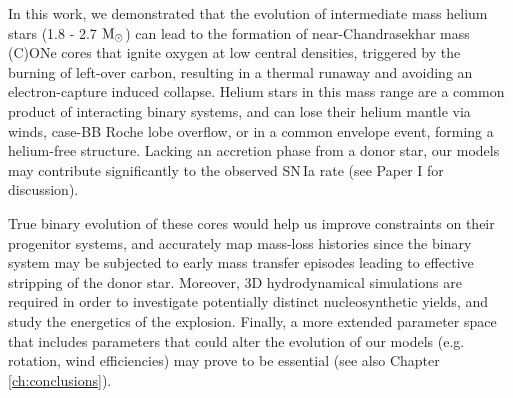 \documentclass[../../main/thesis_msc.tex]{subfiles}
\begin{document}
In this work, we demonstrated that the evolution of intermediate mass helium stars (1.8 - 2.7 $\rm M_{\odot}$) can lead to the formation of near-Chandrasekhar mass (C)ONe cores that ignite oxygen at low central densities, triggered by the burning of left-over carbon, resulting in a thermal runaway and avoiding an electron-capture induced collapse. Helium stars in this mass range are a common product of interacting binary systems, and can lose their helium mantle via winds, case-BB Roche lobe overflow, or in a common envelope event, forming a helium-free structure. Lacking an accretion phase from a donor star, our models may contribute significantly to the observed SN\,Ia rate (see Paper I for discussion).

True binary evolution of these cores would help us improve constraints on their progenitor systems, and accurately map mass-loss histories since the binary system may be subjected to early mass transfer episodes leading to effective stripping of the donor star. Moreover, 3D hydrodynamical simulations are required in order to investigate potentially distinct nucleosynthetic yields, and study the energetics of the explosion. Finally, a more extended parameter space that includes parameters that could alter the evolution of our models (e.g. rotation, wind efficiencies) may prove to be essential (see also Chapter\,\ref{ch:conclusions}).
\end{document}
